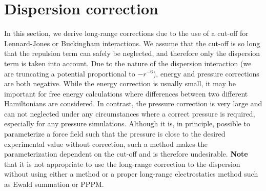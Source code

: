 \section{Dispersion correction}
In this section, we derive long-range corrections due to the use of a
cut-off for Lennard-Jones or Buckingham interactions.
We assume that the cut-off is
so long that the repulsion term can safely be neglected, and therefore
only the dispersion term is taken into account. Due to the nature of
the dispersion interaction (we are truncating a potential proportional
to $-r^{-6}$), energy and pressure corrections are both negative. While
the energy correction is usually small, it may be important for free
energy calculations where differences between two different Hamiltonians
are considered. In contrast, the pressure correction is very large and
can not neglected under any circumstances where a correct pressure is
required, especially for any pressure simulations. Although it is, in
principle, possible to parameterize a force field such that the pressure
is close to the desired experimental value without correction, such a
method makes the parameterization dependent on the cut-off and is therefore
undesirable. {\bf Note} that it is not appropriate to use the long-range
correction to the dispersion without using either a
 method or a proper long-range
electrostatics method such as Ewald summation or PPPM.

